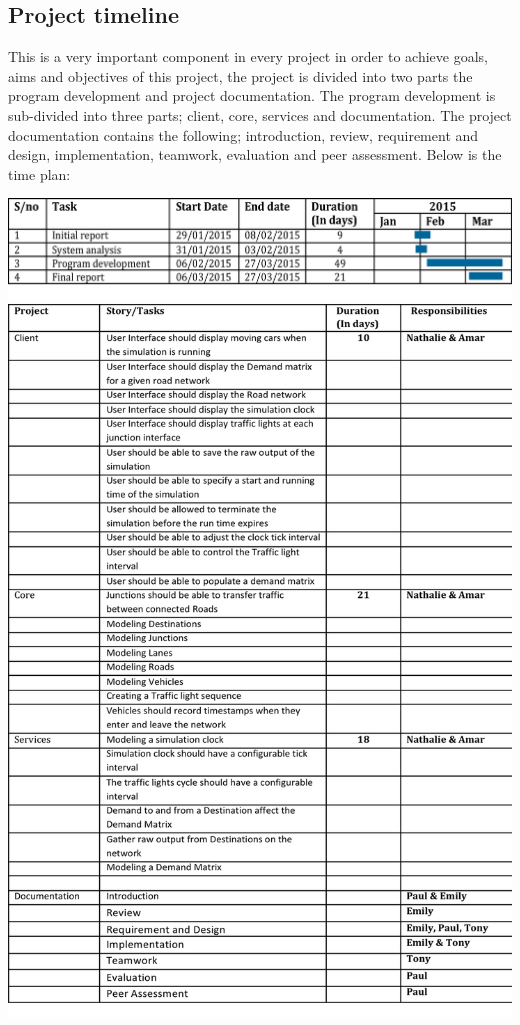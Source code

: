 \subsection{Project timeline}
This is a very important component in every project in order to achieve goals, aims and objectives of this project, the project is divided into two parts the program development and project documentation. The program development is sub-divided into three parts; client, core, services and documentation. The project documentation contains the following; introduction, review, requirement and design, implementation, teamwork, evaluation and peer assessment. Below is the time plan:
\begin{center}
\includegraphics[]{./images/ganttchart.png}
\includegraphics[scale=0.8]{./images/schedule.png}
\end{center}

